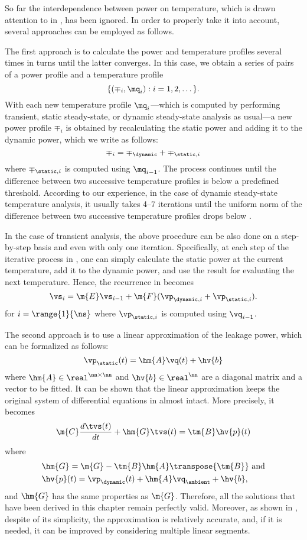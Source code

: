 So far the interdependence between power on temperature, which is drawn
attention to in , has been ignored. In order to properly take
it into account, several approaches can be employed as follows.

The first approach is to calculate the power and temperature profiles several
times in turns until the latter converges. In this case, we obtain a series of
pairs of a power profile and a temperature profile
\[
  \{ (\mp_i, \mq_i): i = 1, 2, \dots \}.
\]
With each new temperature profile $\mq_i$---which is computed by performing
transient, static steady-state, or dynamic steady-state analysis as usual---a
new power profile $\mp_i$ is obtained by recalculating the static power and
adding it to the dynamic power, which we write as follows:
\[
  \mp_i = \mp_\dynamic + \mp_{\static, i}
\]
where $\mp_{\static, i}$ is computed using $\mq_{i - 1}$. The process continues
until the difference between two successive temperature profiles is below a
predefined threshold. According to our experience, in the case of dynamic
steady-state temperature analysis, it usually takes 4--7 iterations until the
uniform norm of the difference between two successive temperature profiles drops
below .

In the case of transient analysis, the above procedure can be also done on a
step-by-step basis and even with only one iteration. Specifically, at each step
of the iterative process in , one can simply
calculate the static power at the current temperature, add it to the dynamic
power, and use the result for evaluating the next temperature. Hence, the
recurrence in  becomes
\[
  \vs_i = \m{E} \vs_{i - 1} + \m{F} (\vp_{\dynamic, i} + \vp_{\static, i}).
\]
for $i = \range{1}{\ns}$ where $\vp_{\static, i}$ is computed using $\vq_{i -
1}$.

The second approach is to use a linear approximation of the leakage power, which
can be formalized as follows:
\[
  \vp_\static(t) = \hm{A} \vq(t) + \hv{b}
\]
where $\hm{A} \in \real^{\nn \times \nn}$ and $\hv{b} \in \real^\nn$ are a
diagonal matrix and a vector to be fitted. It can be shown that the linear
approximation keeps the original system of differential equations in
 almost intact. More precisely, it
becomes
\[
  \m{C} \frac{d\tvs(t)}{dt} + \hm{G} \tvs(t) = \tm{B} \hv{p}(t)
\]
where
\begin{align*}
  & \hm{G} = \m{G} - \tm{B} \hm{A} \transpose{\tm{B}} \text{ and} \\
  & \hv{p}(t) = \vp_\dynamic(t) + \hm{A} \vq_\ambient + \hv{b},
\end{align*}
and $\hm{G}$ has the same properties as $\m{G}$. Therefore, all the solutions
that have been derived in this chapter remain perfectly valid. Moreover, as
shown in \cite{liu2007}, despite of its simplicity, the approximation is
relatively accurate, and, if it is needed, it can be improved by considering
multiple linear segments.

